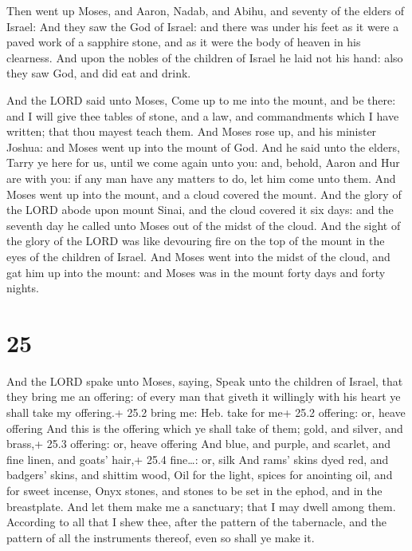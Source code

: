  Then went up Moses, and Aaron, Nadab, and Abihu, and
seventy of the elders of Israel:  And they saw the God of
Israel: and there was under his feet as it were a paved work of a
sapphire stone, and as it were the body of heaven in his clearness.
 And upon the nobles of the children of Israel he laid not
his hand: also they saw God, and did eat and drink.

 And the LORD said unto Moses, Come up to me into the
mount, and be there: and I will give thee tables of stone, and a law,
and commandments which I have written; that thou mayest teach them.
 And Moses rose up, and his minister Joshua: and Moses went
up into the mount of God.  And he said unto the elders,
Tarry ye here for us, until we come again unto you: and, behold, Aaron
and Hur are with you: if any man have any matters to do, let him come
unto them.  And Moses went up into the mount, and a cloud
covered the mount.  And the glory of the LORD abode upon
mount Sinai, and the cloud covered it six days: and the seventh day he
called unto Moses out of the midst of the cloud.  And the
sight of the glory of the LORD was like devouring fire on the top of the
mount in the eyes of the children of Israel.  And Moses
went into the midst of the cloud, and gat him up into the mount: and
Moses was in the mount forty days and forty nights.

\hypertarget{section-24}{%
\section{25}\label{section-24}}

 And the LORD spake unto Moses, saying,  Speak
unto the children of Israel, that they bring me an offering: of every
man that giveth it willingly with his heart ye shall take my offering.+
25.2 bring me: Heb. take for me+ 25.2 offering: or, heave offering
 And this is the offering which ye shall take of them; gold,
and silver, and brass,+ 25.3 offering: or, heave offering 
And blue, and purple, and scarlet, and fine linen, and goats' hair,+
25.4 fine\ldots: or, silk  And rams' skins dyed red, and
badgers' skins, and shittim wood,  Oil for the light, spices
for anointing oil, and for sweet incense,  Onyx stones, and
stones to be set in the ephod, and in the breastplate.  And
let them make me a sanctuary; that I may dwell among them. 
According to all that I shew thee, after the pattern of the tabernacle,
and the pattern of all the instruments thereof, even so shall ye make
it.


